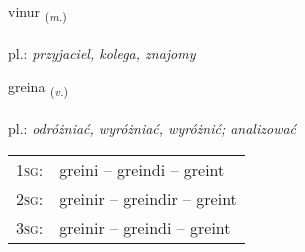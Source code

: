 \documentclass[frontgrid, backgrid]{flacards}\usepackage[]{graphicx}\usepackage[]{xcolor}
\begin{document}
\renewcommand{\blhead}{\vskip5pt {\small\bfseries\footnotesize Nafnorð | Noun }}
\renewcommand{\bcfoot}{\vskip5pt \hspace{2pt}{\small\bfseries\footnotesize 1K}}


{vinur \small{\textsubscript{(\textit{m.})}} \\[1ex] %
\textphonetic{[vɪːnʏr]} \\
pl.: \emph{przyjaciel, kolega, znajomy} \\  [2ex]
\renewcommand*{\arraystretch}{0.8}
}

\renewcommand{\flhead}{\vskip5pt \fboxsep=0pt {\small\bfseries\footnotesize Sagnorð | Verb}}
\renewcommand{\fcfoot}{\vskip5pt \fboxsep=0pt \hspace{2pt}{\small\bfseries\footnotesize 1K}}

\renewcommand{\blhead}{\vskip5pt {\small\bfseries\footnotesize Sagnorð | Verb }}
\renewcommand{\bcfoot}{\vskip5pt \hspace{2pt}{\small\bfseries\footnotesize 1K}}


{greina \small{\textsubscript{(\textit{v.})}} \\[1ex] %
\textphonetic{[kreiːna]} \\
pl.: \emph{odróżniać, wyróżniać, wyróżnić; analizować} \\  [2ex]
\renewcommand*{\arraystretch}{0.8}
\begin{tabular}{p{1cm}l}
\textsc{1sg}: & greini -- greindi -- greint \\ 
\textsc{2sg}: & greinir -- greindir -- greint \\ 
\textsc{3sg}: & greinir -- greindi -- greint \\ 
\end{tabular}
}
\end{document}
